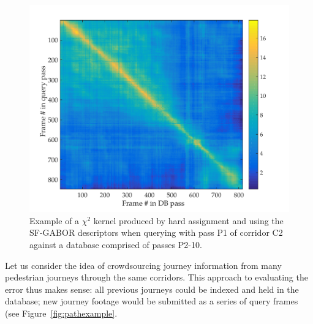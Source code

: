 \begin{figure}[h]
\centering
\includegraphics[width=\linewidth]{./gfx/Chapter04/kernel.pdf}
\caption{Example of a $\chi^2$ kernel produced by hard assignment and using the SF-GABOR descriptors when querying with pass P1 of corridor C2 against a database comprised of passes P2-10.}
\label{fig:kernel}
\end{figure}

Let us consider the idea of crowdsourcing journey information from many pedestrian journeys through the same corridors. This approach to evaluating the error thus makes sense:  all previous journeys could be indexed and held in the database; new journey footage would be submitted as a series of query frames (see Figure~\ref{fig:pathexample}.  

